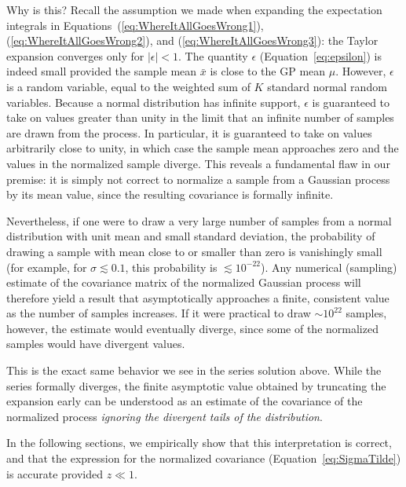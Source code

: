 \documentclass[modern]{aastex62}
\begin{document}
Why is this? Recall the assumption we made when expanding the expectation
integrals in Equations~(\ref{eq:WhereItAllGoesWrong1}), (\ref{eq:WhereItAllGoesWrong2}),
and (\ref{eq:WhereItAllGoesWrong3}): the Taylor expansion converges only for
$\big|\epsilon| < 1$. The quantity $\epsilon$ (Equation~\ref{eq:epsilon})
is indeed small provided the sample mean $\bar{x}$ is close to the GP
mean $\mu$. However, $\epsilon$ is a random variable, equal to
the weighted sum of $K$ standard normal random variables. Because a normal
distribution has infinite support, $\epsilon$ is guaranteed to take on
values greater than unity in the limit that an infinite number of samples
are drawn from the process. In particular, it is guaranteed to take on values
arbitrarily close to unity, in which case the sample mean approaches zero and
the values in the normalized sample diverge.
This reveals a fundamental flaw in our premise:
it is simply not correct to normalize a sample from a Gaussian process by its
mean value, since the resulting covariance is formally infinite.

Nevertheless, if one were to draw a very large number of samples from a normal
distribution with unit mean and small standard deviation,
the probability of drawing a sample with mean close to or smaller than zero
is vanishingly small (for example, for $\sigma \lesssim 0.1$, this probability
is $\lesssim 10^{-22}$).
Any numerical (sampling) estimate of the
covariance matrix of the normalized Gaussian process will therefore yield
a result that asymptotically approaches a finite, consistent value as the
number of samples increases. If it were practical to draw
$\sim 10^{22}$ samples, however, the estimate would eventually diverge, since
some of the normalized samples would have divergent values.

This is the exact same behavior we see in the series solution above.
While the series formally diverges, the finite asymptotic value obtained
by truncating the expansion early can be understood as an estimate of
the covariance of the normalized process \emph{ignoring the divergent
    tails of the distribution}.

In the following sections, we empirically show that this interpretation is
correct, and that the expression for the normalized covariance
(Equation~\ref{eq:SigmaTilde}) is accurate provided $z \ll 1$.


\ifdefined {}

    \clearpage

    \appendix
\end{document}
